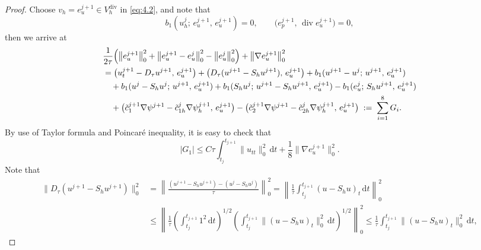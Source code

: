\documentclass[a4paper,fleqn]{cas-sc}
\numberwithin{equation}{section}
\theoremstyle{definition}
\begin{document}
\begin{proof}
Choose $v_{h} = e_{u}^{j+1} \in V_{h}^{\mathrm{div}}$ in \eqref{eq:4.2}, and note that
\begin{equation}\label{eq:4.20}
  b_{1}(u_{h}^{j};\, e_{u}^{j+1},\, e_{u}^{j+1}) = 0, \qquad
  \bigl(e_{p}^{j+1},\, \operatorname{div} e_{u}^{j+1}\bigr) = 0,
\end{equation}
then we arrive at
\begin{align}
  &\frac{1}{2\tau}\Bigl(\bigl\|e_{u}^{j+1}\bigr\|_{0}^{2}
                       + \bigl\|e_{u}^{j+1} - e_{u}^{j}\bigr\|_{0}^{2}
                       - \bigl\|e_{u}^{j}\bigr\|_{0}^{2}\Bigr)
   + \bigl\|\nabla e_{u}^{j+1}\bigr\|_{0}^{2}
  \nonumber\\
  &= \bigl(u_{t}^{j+1} - D_{\tau}u^{j+1},\, e_{u}^{j+1}\bigr)
   + \bigl(D_{\tau}(u^{j+1} - S_{h}u^{j+1}),\, e_{u}^{j+1}\bigr)
   + b_{1}(u^{j+1}-u^{j};\, u^{j+1},\, e_{u}^{j+1})
  \nonumber\\
  &\quad + b_{1}(u^{j} - S_{h}u^{j};\, u^{j+1},\, e_{u}^{j+1})
   + b_{1}(S_{h}u^{j};\, u^{j+1} - S_{h}u^{j+1},\, e_{u}^{j+1})
   - b_{1}(e_{u}^{j};\, S_{h}u^{j+1},\, e_{u}^{j+1})
  \nonumber\\
  &\quad + \bigl(\tilde{c}_{1}^{j+1}\nabla\psi^{j+1}
              - \tilde{c}_{1h}^{j}\nabla\psi_{h}^{j+1},\, e_{u}^{j+1}\bigr)
   - \bigl(\tilde{c}_{2}^{j+1}\nabla\psi^{j+1}
              - \tilde{c}_{2h}^{j}\nabla\psi_{h}^{j+1},\, e_{u}^{j+1}\bigr)
   \;:=\; \sum_{i=1}^{8}G_{i}.
  \label{eq:4.21}
\end{align}
By use of Taylor formula and Poincar\'{e} inequality, it is easy to check that
\begin{equation}\label{eq:4.22}
  |G_{1}| \leq C\tau\int_{t_{j}}^{t_{j+1}}\|u_{tt}\|_{0}^{2}\,\mathrm{d}t
             + \frac{1}{8}\bigl\|\nabla e_{u}^{j+1}\bigr\|_{0}^{2}.
\end{equation}
Note that
\begin{align}
  \bigl\|D_{\tau}(u^{j+1} - S_{h}u^{j+1})\bigr\|_{0}^{2}
  &= \left\|\frac{(u^{j+1} - S_{h}u^{j+1}) - (u^{j} - S_{h}u^{j})}{\tau}\right\|_{0}^{2}
   = \left\|\frac{1}{\tau}\int_{t_{j}}^{t_{j+1}}(u - S_{h}u)_{t}\,\mathrm{d}t\right\|_{0}^{2}
  \nonumber\\
  &\leq \left\|\frac{1}{\tau}\left(\int_{t_{j}}^{t_{j+1}}1^{2}\,\mathrm{d}t\right)^{\!1/2}
         \left(\int_{t_{j}}^{t_{j+1}}\|(u - S_{h}u)_{t}\|_{0}^{2}\,\mathrm{d}t\right)^{\!1/2}
        \right\|_{0}^{2}
  \leq \frac{1}{\tau}\int_{t_{j}}^{t_{j+1}}\|(u - S_{h}u)_{t}\|_{0}^{2}\,\mathrm{d}t,
  \label{eq:4.23}
\end{align}

\end{proof}
\end{document}
